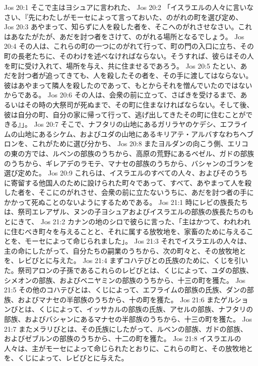 Jos 20:1  そこで主はヨシュアに言われた、
Jos 20:2  「イスラエルの人々に言いなさい、『先にわたしがモーセによって言っておいた、のがれの町を選び定め、
Jos 20:3  あやまって、知らずに人を殺した者を、そこへのがれさせなさい。これはあなたがたが、あだを討つ者をさけて、のがれる場所となるでしょう。
Jos 20:4  その人は、これらの町の一つにのがれて行って、町の門の入口に立ち、その町の長老たちに、そのわけを述べなければならない。そうすれば、彼らはその人を町に受け入れて、場所を与え、共に住ませるであろう。
Jos 20:5  たとい、あだを討つ者が追ってきても、人を殺したその者を、その手に渡してはならない。彼はあやまって隣人を殺したのであって、もとからそれを憎んでいたのではないからである。
Jos 20:6  その人は、会衆の前に立って、さばきを受けるまで、あるいはその時の大祭司が死ぬまで、その町に住まなければならない。そして後、彼は自分の町、自分の家に帰って行って、逃げ出してきたその町に住むことができる』」。
Jos 20:7  そこで、ナフタリの山地にあるガリラヤのケデシ、エフライムの山地にあるシケム、およびユダの山地にあるキリアテ・アルバすなわちヘブロンを、これがために選び分かち、
Jos 20:8  またヨルダンの向こう側、エリコの東の方では、ルベンの部族のうちから、高原の荒野にあるベゼル、ガドの部族のうちから、ギレアデのラモテ、マナセの部族のうちから、バシャンのゴランを選び定めた。
Jos 20:9  これらは、イスラエルのすべての人々、およびそのうちに寄留する他国人のために設けられた町々であって、すべて、あやまって人を殺した者を、そこにのがれさせ、会衆の前に立たないうちに、あだを討つ者の手にかかって死ぬことのないようにするためである。
Jos 21:1  時にレビの族長たちは、祭司エレアザル、ヌンの子ヨシュアおよびイスラエルの部族の族長たちのもとにきて、
Jos 21:2  カナンの地のシロで彼らに言った、「主はかつて、われわれに住むべき町々を与えることと、それに属する放牧地を、家畜のために与えることを、モーセによって命じられました」。
Jos 21:3  それでイスラエルの人々は、主の命にしたがって、自分たちの嗣業のうちから、次の町々と、その放牧地とを、レビびとに与えた。
Jos 21:4  まずコハテびとの氏族のために、くじを引いた。祭司アロンの子孫であるこれらのレビびとは、くじによって、ユダの部族、シメオンの部族、およびベニヤミンの部族のうちから、十三の町を獲た。
Jos 21:5  その他のコハテびとは、くじによって、エフライムの部族の氏族、ダンの部族、およびマナセの半部族のうちから、十の町を獲た。
Jos 21:6  またゲルションびとは、くじによって、イッサカルの部族の氏族、アセルの部族、ナフタリの部族、およびバシャンにあるマナセの半部族のうちから、十三の町を獲た。
Jos 21:7  またメラリびとは、その氏族にしたがって、ルベンの部族、ガドの部族、およびゼブルンの部族のうちから、十二の町を獲た。
Jos 21:8  イスラエルの人々は、主がモーセによって命じられたとおりに、これらの町と、その放牧地とを、くじによって、レビびとに与えた。
